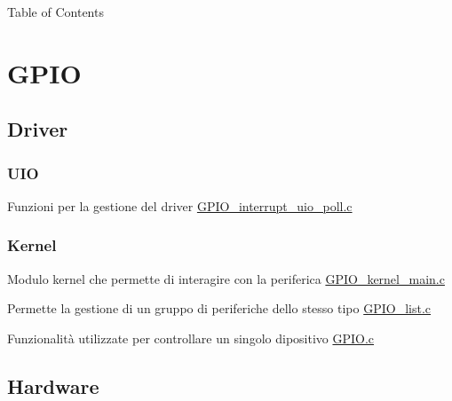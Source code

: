 \begin{DoxyParagraph}{Table of Contents}

\end{DoxyParagraph}
\hypertarget{index_GPIO}{}\section{G\+P\+IO}\label{index_GPIO}
\hypertarget{index_Driver}{}\subsection{Driver}\label{index_Driver}
\hypertarget{index_UIO}{}\subsubsection{U\+IO}\label{index_UIO}

\begin{DoxyItemize}
\item Funzioni per la gestione del driver \hyperlink{GPIO__interrupt__uio__poll_8c}{G\+P\+I\+O\+\_\+interrupt\+\_\+uio\+\_\+poll.\+c} 
\end{DoxyItemize}\hypertarget{index_Kernel}{}\subsubsection{Kernel}\label{index_Kernel}

\begin{DoxyItemize}
\item Modulo kernel che permette di interagire con la periferica \hyperlink{GPIO__kernel__main_8c}{G\+P\+I\+O\+\_\+kernel\+\_\+main.\+c}
\item Permette la gestione di un gruppo di periferiche dello stesso tipo \hyperlink{GPIO__list_8c}{G\+P\+I\+O\+\_\+list.\+c}
\item Funzionalità utilizzate per controllare un singolo dipositivo \hyperlink{GPIO_8c}{G\+P\+I\+O.\+c} 
\end{DoxyItemize}\hypertarget{index_Hardware}{}\subsection{Hardware}\label{index_Hardware}

